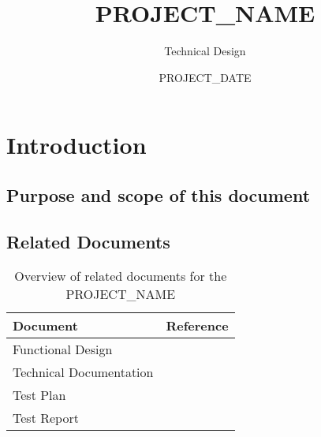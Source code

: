 \documentclass[signature]{deltares_report}
\begin{document}
\pagestyle{empty}
\cleardoublepage
%

\newcommand{\ProgramName}{PROJECT_NAME\xspace}

\title{\ProgramName}
\subtitle{Technical Design}
\classification{-}

\date{PROJECT_DATE}



\summary{}

\revieweri{}
\approvali{}

\disclaimer{}

\deltarestitle


\chapter{Introduction} 
\label{chapterIntroduction}

\section{Purpose and scope of this document} \label{sec:PurposeAndScope}

\section{Related Documents}
\label{sec:RelatedDocuments}
\bigskip
\begin{longtable}{|p{}|p{}|}
\caption{Overview of related documents for the \ProgramName \label{tab:RelatedDocuments}}\\	\hline
		\hline 
		\textbf{Document} & \textbf{Reference} \\
		\hline 
		\hline 
		Functional Design & \citep{PROJECT_NAME_FunctionalDesignPROJECT_YEAR} \\
		Technical Documentation & \citep{PROJECT_NAME_TechnicalDocumentationPROJECT_YEAR} \\
		Test Plan & \citep{PROJECT_NAME_TestPlanPROJECT_YEAR} \\
		Test Report & \citep{PROJECT_NAME_TestReportPROJECT_YEAR} \\
    \hline			
\end{longtable}
\end{document}
